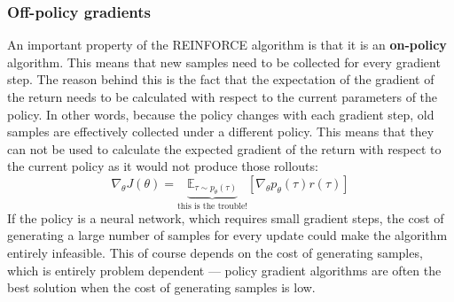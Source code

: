 \subsubsection{Off-policy gradients}
An important property of the REINFORCE algorithm is that it
is an \textbf{on-policy} algorithm.
This means that new samples need to be collected for every gradient step.
The reason behind this is the fact that the expectation of the gradient 
of the return needs to be calculated with respect to the current parameters
of the policy.
In other words, because the policy changes with each gradient step,
old samples are effectively collected under a different policy.
This means that they can not be used to calculate the expected gradient 
of the return with respect to the current policy as it would not
produce those rollouts:
\begin{equation}
		\nabla_\theta J(\theta) = \underbrace{\mathbb{E}_{\tau \sim p_\theta(\tau)}}_{\text{this is the trouble!}} [\nabla_\theta p_\theta(\tau)r(\tau)]
\end{equation}
If the policy is a neural network, which requires small gradient steps,
the cost of generating a large number of samples for every update
could make the algorithm entirely infeasible.
This of course depends on the cost of generating samples,
which is entirely problem dependent ---
policy gradient algorithms are often the best solution when 
the cost of generating samples is low.

